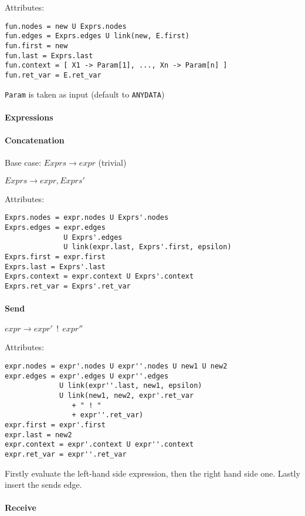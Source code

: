 Attributes:
\begin{verbatim}
fun.nodes = new U Exprs.nodes
fun.edges = Exprs.edges U link(new, E.first)
fun.first = new
fun.last = Exprs.last
fun.context = [ X1 -> Param[1], ..., Xn -> Param[n] ]
fun.ret_var = E.ret_var
\end{verbatim}

\texttt{Param} is taken as input (default to \texttt{ANYDATA})

\paragraph{Expressions}

\paragraph{Concatenation}

Base case: $Exprs \to expr$ (trivial)

$Exprs \to expr,Exprs'$

Attributes:
\begin{verbatim}
Exprs.nodes = expr.nodes U Exprs'.nodes
Exprs.edges = expr.edges 
              U Exprs'.edges 
              U link(expr.last, Exprs'.first, epsilon)
Exprs.first = expr.first
Exprs.last = Exprs'.last
Exprs.context = expr.context U Exprs'.context
Exprs.ret_var = Exprs'.ret_var
\end{verbatim}

\paragraph{Send}

$expr \to expr'\ \ !\ \ expr''$

Attributes:
\begin{verbatim}
expr.nodes = expr'.nodes U expr''.nodes U new1 U new2
expr.edges = expr'.edges U expr''.edges
             U link(expr''.last, new1, epsilon)
             U link(new1, new2, expr'.ret_var 
                + " ! " 
                + expr''.ret_var)
expr.first = expr'.first
expr.last = new2
expr.context = expr'.context U expr''.context
expr.ret_var = expr''.ret_var
\end{verbatim}

Firstly evaluate the left-hand side expression, then the right hand side one. 
Lastly insert the sends edge.

\paragraph{Receive}

